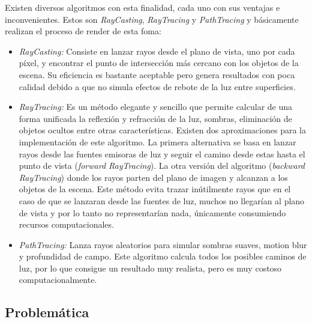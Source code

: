 Existen diversos algoritmos con esta finalidad, cada uno con sus ventajas e inconvenientes\cite{real-time}. Estos son \emph{RayCasting}, \emph{RayTracing} y
\emph{PathTracing} y básicamente realizan el proceso de render de esta foma:
\begin{itemize}
\item\emph{RayCasting:} Consiste en lanzar rayos desde el plano de vista, uno por cada píxel, y encontrar el punto de intersección
más cercano con los objetos de la escena. Su eficiencia es bastante aceptable pero genera resultados con poca calidad debido a que no simula efectos de rebote de la luz entre superficies.
\item\emph{RayTracing:} Es un método elegante  y sencillo que permite calcular de una forma unificada la reflexión y refracción de la luz,
sombras, eliminación de objetos ocultos entre otras características. Existen dos aproximaciones para la implementación de este algoritmo. La primera alternativa se basa en lanzar rayos desde las fuentes emisoras de luz y seguir el camino desde estas hasta el punto de vista (\emph{forward RayTracing}).
La otra versión del algoritmo (\emph{backward RayTracing}) donde los rayos parten del plano de imagen y alcanzan a los objetos de la escena.  Este método evita trazar
inútilmente rayos que en el caso de que se lanzaran desde las fuentes de luz, muchos no llegarían al plano de vista y por lo tanto no representarían nada, únicamente consumiendo recursos computacionales.
\item\emph{PathTracing:} Lanza rayos aleatorios para simular sombras suaves, motion blur  y profundidad de campo. Este algoritmo calcula todos los posibles caminos
de luz, por lo que consigue un resultado muy realista, pero es muy costoso computacionalmente.
\end{itemize}

%

\subsection{Problemática}
\label{sec:problematica}


